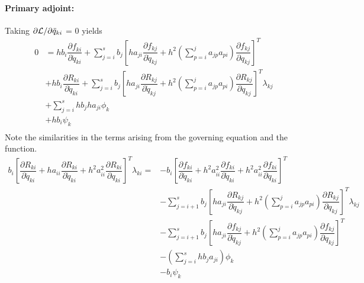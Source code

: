 \documentclass[10pt,letter]{book}
\newcommand{\pd}[2]{\dfrac{\partial #1}{\partial #2}}
\begin{document}
     \paragraph{Primary adjoint:}
     Taking $\partial{\cal{L}}/\partial{\ddot{q}_{ki}}$ = 0 yields
     \begin{equation}\nonumber
       \begin{split}
         0 & = hb_i \pd{f_{ki}}{\ddot{q}_{ki}} + \sum_{j=i}^s b_j \left[ ha_{ji} \pd{f_{kj}}{\dot{q}_{kj}} 
           + h^2 (\sum_{p=i}^j a_{jp}a_{pi}) 
           \pd{f_{kj}}{{q}_{kj}} \right]^T \\
         &  + hb_i \pd{R_{ki}}{\ddot{q}_{ki}} + \sum_{j=i}^s b_j \left[ ha_{ji} \pd{R_{kj}}{\dot{q}_{kj}} 
           + h^2 (\sum_{p=i}^j a_{jp}a_{pi}) 
           \pd{R_{kj}}{{q}_{kj}} \right]^T \lambda_{kj} \\ 
         &  + \sum_{j=i}^s h b_j h a_{ji} \phi_{k}  \\
         &  +  h b_i \psi_{k} \\
       \end{split}
     \end{equation}
     Note the similarities in the terms arising from the governing
     equation and the function.
     \begin{equation}\nonumber
       \begin{split}
         b_i \left[ \pd{R_{ki}}{\ddot{q}_{ki}} + ha_{ii} \pd{R_{ki}}{\dot{q}_{ki}} + h^2 a_{ii}^2 \pd{R_{ki}}{{q}_{ki}} \right]^T \lambda_{ki} = & - b_i \left[ \pd{f_{ki}}{\ddot{q}_{ki}} + h^2a_{ii}^2 \pd{f_{ki}}{\dot{q}_{ki}} + h^2a_{ii}^2 \pd{f_{ki}}{{q}_{ki}} \right]^T \\
         & - \sum_{j=i+1}^s b_j \left[ ha_{ji} \pd{R_{kj}}{\dot{q}_{kj}} 
           + h^2 (\sum_{p=i}^j a_{jp}a_{pi}) 
           \pd{R_{kj}}{{q}_{kj}} \right]^T \lambda_{kj} \\
         & -  \sum_{j=i+1}^s b_j \left[ ha_{ji} \pd{f_{kj}}{\dot{q}_{kj}} 
           + h^2 (\sum_{p=i}^j a_{jp}a_{pi}) 
           \pd{f_{kj}}{{q}_{kj}} \right]^T  \\
         & -   (\sum_{j=i}^s h b_j a_{ji}) \phi_{k}  \\
         &  - b_i \psi_{k} 
       \end{split}
     \end{equation}
     
\end{document}
